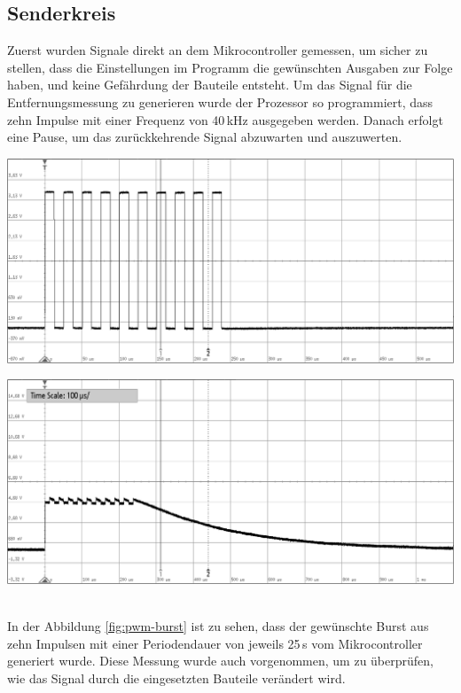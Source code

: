 \subsection{Senderkreis}
Zuerst wurden Signale direkt an dem Mikrocontroller gemessen, um sicher zu stellen, dass die Einstellungen im Programm die gewünschten Ausgaben zur Folge haben, und keine Gefährdung der Bauteile entsteht.
Um das Signal für die Entfernungsmessung zu generieren wurde der Prozessor so programmiert, dass zehn Impulse mit einer Frequenz von 40\,kHz ausgegeben werden. Danach erfolgt eine Pause, um das zurückkehrende Signal abzuwarten und auszuwerten.\\
\begin{minipage}{0.46\textwidth}
\includegraphics[width=1\textwidth%
]{Abbildungen/MessungenP1/PWM-von-der-cpu.png}
\label{fig:pwm-burst}
\end{minipage}\qquad
\begin{minipage}{0.46\textwidth}
\includegraphics[width=1\textwidth%
]{Abbildungen/MessungenP1/PWM-ausgabe-mit-Hi-Side.png}
\label{fig:HiSide}
\end{minipage}\\
In der Abbildung \ref{fig:pwm-burst} ist zu sehen, dass der gewünschte Burst aus zehn Impulsen mit einer Periodendauer von jeweils 25\,\textmu s vom Mikrocontroller generiert wurde. Diese Messung wurde auch vorgenommen, um zu überprüfen, wie das Signal durch die eingesetzten Bauteile verändert wird.\\
